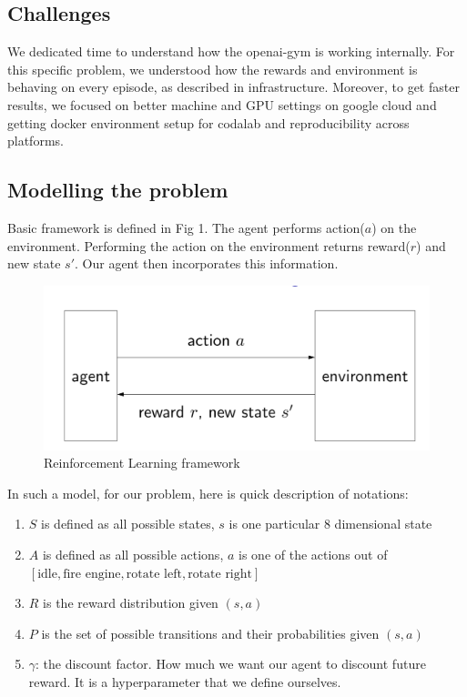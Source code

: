 \documentclass[12pt]{article}
\begin{document}
\subsection{Challenges}

We dedicated time to understand how the openai-gym is working internally. For this specific problem, we understood how the rewards and environment is behaving on every episode, as described in infrastructure. Moreover, to get faster results, we focused on better machine and GPU settings on google cloud and getting docker environment setup for codalab and reproducibility across platforms.

\subsection{Modelling the problem}

Basic framework is defined in Fig 1. The agent performs action($a$) on the environment. Performing the action on the environment returns reward($r$) and new state $s'$. Our agent then incorporates this information.

\begin{figure}%
\centering
\includegraphics[scale=0.3]{reinforcement_framework.png}%
\caption{Reinforcement Learning framework}%
\label{fig:datastats}%
\end{figure}

In such a model, for our problem, here is quick description of notations:
\begin{enumerate}
\item $S$ is defined as all possible states, $s$ is one particular 8 dimensional state
\item $A$ is defined as all possible actions, $a$ is one of the actions out of $[\text{idle}, \text{fire engine}, \text{rotate left}, \text{rotate right}]$
\item $R$ is the reward distribution given $(s, a)$
\item $P$ is the set of possible transitions and their probabilities given $(s, a)$
\item $\gamma$: the discount factor. How much we want our agent to discount future reward. It is a hyperparameter that we define ourselves.
\end{enumerate}
\end{document}
